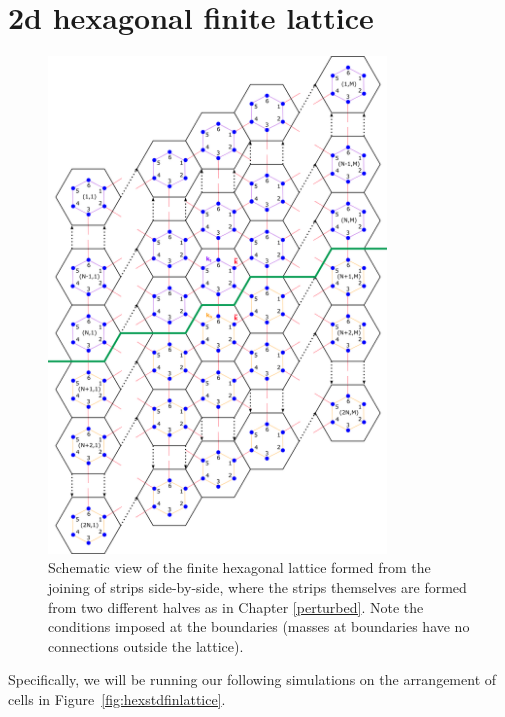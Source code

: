 \section{2d hexagonal finite lattice}
\begin{figure}[!h]
\centering
\includegraphics[width=0.8\textwidth]{imgs/hexfinitemodel.png}
\caption{\label{fig:kagomeM} Schematic view of the finite hexagonal lattice
  formed from the joining of strips side-by-side, where the strips themselves
  are formed from two different halves as in Chapter \ref{perturbed}. Note the
  conditions imposed at the boundaries (masses at boundaries have no
  connections outside the lattice).}
\end{figure}

Specifically, we will be running our following simulations on the arrangement
of cells in Figure~\ref{fig:hexstdfinlattice}.

